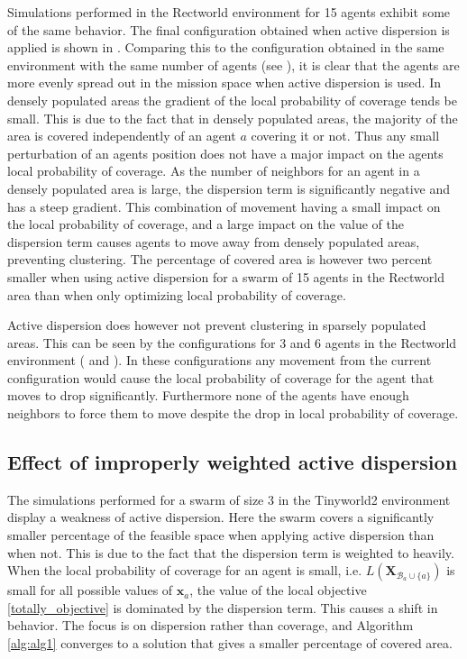 Simulations performed in the Rectworld environment for 15 agents exhibit some of the same behavior. The final configuration obtained when active dispersion
is applied is shown in . Comparing this to the configuration obtained in the same environment with the same number of agents (see ), 
it is clear that the agents are more evenly spread out in the mission space when active dispersion is used. In densely populated areas the gradient of the local probability of coverage tends be small. This is due to the fact that in densely populated areas, 
the majority of the area is covered independently of an agent $a$ covering it or not. Thus any small perturbation of an agents position does not have a major impact on
the agents local probability of coverage. As the number of neighbors for an agent in a densely populated area is large, the dispersion term is significantly negative and has a steep gradient.
This combination of movement having a small impact on the local probability of coverage, and a large impact on the value of the dispersion term causes agents to move away from densely populated areas, 
preventing clustering. The percentage of covered area is however two percent smaller when using active dispersion for a swarm of 15 agents in the Rectworld area than when only optimizing local probability of coverage.

Active dispersion does however not prevent clustering in sparsely populated areas. This can be seen by the configurations for 3 and 6 agents in the
Rectworld environment ( and ). In these configurations any
movement from the current configuration would cause the local
probability of coverage for the agent that moves to drop significantly. Furthermore none of the agents have enough neighbors to force them to move despite
the drop in local probability of coverage.

\subsection{Effect of improperly weighted active dispersion}\label{secc:improp_weight_disc}
The simulations performed for a swarm of size 3 in the Tinyworld2 environment display a weakness of active dispersion. Here the swarm covers a significantly smaller percentage of the 
feasible space when applying active dispersion than when not. This is due to the fact that the dispersion term is weighted to heavily. When the local probability of coverage for an agent is small, i.e. $L(\mathbf{X}_{\mathcal{B}_{a}\cup\{a\}})$ is small 
for all possible values of $\mathbf{x}_{a}$, the value of 
the local objective \eqref{totally_objective} is dominated by the dispersion term. This causes a shift in behavior. The focus is on dispersion rather than coverage, and Algorithm \ref{alg:alg1} converges
to a solution that gives a smaller percentage of covered area.

